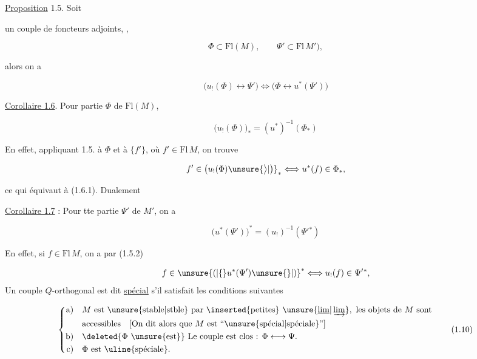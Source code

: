 \uline{Proposition} 1.5. Soit


un couple de foncteurs adjoints,  ,

\[
\Phi\subset\mathrm{Fl}(M),\qquad \Psi'\subset\mathrm{Fl}\,M'), 
\]

alors on a

\[
\big(u_!(\Phi)\longleftrightarrow\Psi'\big)\Longleftrightarrow
\big(\Phi\longleftrightarrow u^*(\Psi')\big)\tag*{(1.5.2)}
\]

\uline{Corollaire 1.6}. Pour  partie $\Phi$ de $\mathrm{Fl}(M)$,

\[
\big(u_!(\Phi)\big)_*=(u^*)^{-1}(\Phi_*)\tag*{(1.6.1)}
\]

En effet, appliquant 1.5. à $\Phi$ et à $\{f'\}$,
où $f'\in\mathrm{Fl}\,M$, on trouve

\[
f'\in\big(u_!(\Phi)\unsure{\big\rangle|\big)}_*\Longleftrightarrow u^*(f)\in\Phi_*,
\]

ce qui équivaut à (1.6.1). Dualement

\uline{Corollaire 1.7} : Pour tte partie $\Psi'$ de $M'$, on
a

\[
\big(u^*(\Psi')\big)^*=(u_!)^{-1}(\Psi'{}^*)\tag*{(1.7.1)}
\]


En effet, si $f\in\mathrm{Fl}\,M$, on a par (1.5.2)

\[
f\in\unsure{(|\{}u^*(\Psi')\unsure{\}|)}^{*}\Longleftrightarrow u_!(f)\in\Psi'{}^*,
\]
Un couple $Q$-orthogonal \inserted{$\Phi\longleftrightarrow\Psi$} est dit  \uline{spécial}
s'il satisfait les conditions suivantes

\[
\left\{\begin{aligned}
\text{a)}\quad &M\ \text{est \unsure{stable|stble} par \inserted{petites} }\unsure{\underline{\lim}|\varinjlim},\ \text{les objets de }M\text{ sont}\\
&\text{accessibles}\quad [\text{On dit alors que }M\text{ est ``\unsure{spécial|spéciale}''}]\\
\text{b)}\quad &\deleted{\Phi\ \text{\unsure{est}}}\ \text{Le couple est clos : }\Phi\longleftrightarrow\Psi.\\
\text{c)}\quad &\Phi\ \text{est \uline{spéciale}.}
\end{aligned}\right.\tag*{(1.10)}
\]

